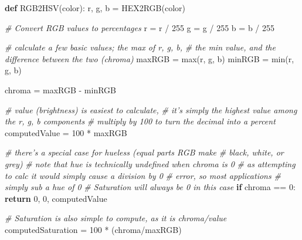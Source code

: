 \documentclass[11pt]{article}
\newenvironment{Shaded}{}{}
\newcommand{\KeywordTok}[1]{\textcolor[rgb]{0.00,0.44,0.13}{\textbf{{#1}}}}
\newcommand{\DecValTok}[1]{\textcolor[rgb]{0.25,0.63,0.44}{{#1}}}
\newcommand{\CommentTok}[1]{\textcolor[rgb]{0.38,0.63,0.69}{\textit{{#1}}}}
\newcommand{\NormalTok}[1]{{#1}}
\newcommand{\ControlFlowTok}[1]{\textcolor[rgb]{0.00,0.44,0.13}{\textbf{{#1}}}}
\newcommand{\OperatorTok}[1]{\textcolor[rgb]{0.40,0.40,0.40}{{#1}}}
\newcommand{\BuiltInTok}[1]{{#1}}
\begin{document}
\begin{Shaded}
\begin{Highlighting}[]
\KeywordTok{def}\NormalTok{ RGB2HSV(color):}
\NormalTok{    r, g, b }\OperatorTok{=}\NormalTok{ HEX2RGB(color)}

    \CommentTok{# Convert RGB values to percentages}
\NormalTok{    r }\OperatorTok{=}\NormalTok{ r }\OperatorTok{/} \DecValTok{255}
\NormalTok{    g }\OperatorTok{=}\NormalTok{ g }\OperatorTok{/} \DecValTok{255}
\NormalTok{    b }\OperatorTok{=}\NormalTok{ b }\OperatorTok{/} \DecValTok{255}

    \CommentTok{# calculate a few basic values; the max of r, g, b, }
    \CommentTok{# the min value, and the difference between the two (chroma)}
\NormalTok{    maxRGB }\OperatorTok{=} \BuiltInTok{max}\NormalTok{(r, g, b)}
\NormalTok{    minRGB }\OperatorTok{=} \BuiltInTok{min}\NormalTok{(r, g, b)}

\NormalTok{    chroma }\OperatorTok{=}\NormalTok{ maxRGB }\OperatorTok{-}\NormalTok{ minRGB}
    
    \CommentTok{# value (brightness) is easiest to calculate,}
    \CommentTok{# it's simply the highest value among the r, g, b components}
    \CommentTok{# multiply by 100 to turn the decimal into a percent}
\NormalTok{    computedValue }\OperatorTok{=} \DecValTok{100} \OperatorTok{*}\NormalTok{ maxRGB}

    \CommentTok{# there's a special case for hueless (equal parts RGB make}
    \CommentTok{#    black, white, or grey)}
    \CommentTok{# note that hue is technically undefined when chroma is 0}
    \CommentTok{# as attempting to calc it would simply cause a division by 0}
    \CommentTok{#    error, so most applications}
    \CommentTok{# simply sub a hue of 0}
    \CommentTok{# Saturation will always be 0 in this case}
    \ControlFlowTok{if}\NormalTok{ chroma }\OperatorTok{==} \DecValTok{0}\NormalTok{:}
        \ControlFlowTok{return} \DecValTok{0}\NormalTok{, }\DecValTok{0}\NormalTok{, computedValue}

    \CommentTok{# Saturation is also simple to compute, as it is chroma/value}
\NormalTok{    computedSaturation }\OperatorTok{=} \DecValTok{100} \OperatorTok{*}\NormalTok{ (chroma}\OperatorTok{/}\NormalTok{maxRGB)}


\end{Highlighting}
\end{Shaded}
\end{document}
